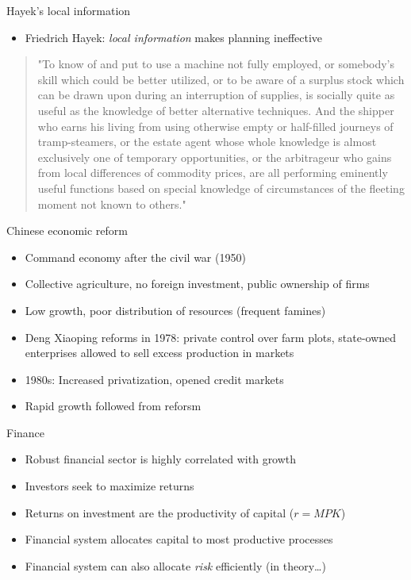 \documentclass[10pt]{beamer}
\begin{document}
\begin{frame}[label={sec:orgf51b8f4}]{}
\alert{Hayek's local information}
\begin{itemize}
\item Friedrich Hayek: \emph{local information} makes planning ineffective
\end{itemize}
\begin{quote}
"To know of and put to use a machine not fully employed, or somebody's skill which could be better utilized, or to be aware of a surplus stock which can be drawn upon during an interruption of supplies, is socially quite as useful as the knowledge of better alternative techniques. And the shipper who earns his living from using otherwise empty or half-filled journeys of tramp-steamers, or the estate agent whose whole knowledge is almost exclusively one of temporary opportunities, or the arbitrageur who gains from local differences of commodity prices, are all performing eminently useful functions based on special knowledge of circumstances of the fleeting moment not known to others."
\end{quote}
\end{frame}

\begin{frame}[label={sec:org06130ec}]{}
\alert{Chinese economic reform}
\begin{itemize}
\item Command economy after the civil war (1950)
\item Collective agriculture, no foreign investment, public ownership of firms
\item Low growth, poor distribution of resources (frequent famines)
\item Deng Xiaoping reforms in 1978: private control over farm plots, state-owned enterprises allowed to sell excess production in markets
\item 1980s: Increased privatization, opened credit markets
\item Rapid growth followed from reforsm
\end{itemize}
\end{frame}

\begin{frame}[label={sec:org8b6291b}]{}
\alert{Finance}
\begin{itemize}
\item Robust financial sector is highly correlated with growth
\item Investors seek to maximize returns
\item Returns on investment are the productivity of capital (\(r=MPK\))
\item Financial system allocates capital to most productive processes
\item Financial system can also allocate \emph{risk} efficiently (in theory\ldots{})
\end{itemize}
\end{frame}
\end{document}
